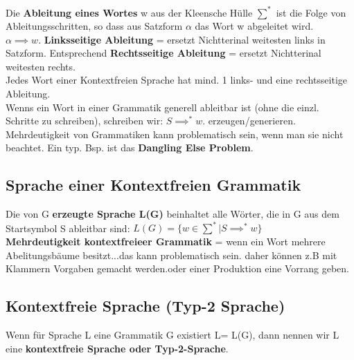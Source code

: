 Die \textbf{Ableitung eines Wortes} w aus der Kleensche Hülle $\sum^*$ ist die Folge von Ableitungsschritten, so dass aus Satzform $\alpha$ das Wort w abgeleitet wird.\\
$\alpha \implies w$. \textbf{Linksseitige Ableitung} = ersetzt Nichtterinal weitesten links in Satzform. Entsprechend \textbf{Rechtsseitige Ableitung} = ersetzt Nichtterinal weitesten rechts.\\
Jedes Wort einer Kontextfreien Sprache hat mind. 1 links- und eine rechtsseitige Ableitung.\\
Wenns ein Wort in einer Grammatik generell ableitbar ist (ohne die einzl. Schritte zu schreiben), schreiben wir: $S \implies ^* w$. erzeugen/generieren.\\ 

Mehrdeutigkeit von Grammatiken kann problematisch sein, wenn man sie nicht beachtet. Ein typ. Bsp. ist das \textbf{Dangling Else Problem}.\\

\subsection*{Sprache einer Kontextfreien Grammatik}
Die von G \textbf{erzeugte Sprache L(G)} beinhaltet alle Wörter, die in G aus dem Startsymbol S ableitbar sind: $L(G) = \{w \in \sum^* | S \implies ^* w \}$ \\
\textbf{Mehrdeutigkeit kontextfreieer Grammatik} = wenn ein Wort mehrere Abelitungsbäume besitzt...das kann problematisch sein. daher können z.B mit Klammern Vorgaben gemacht werden.oder einer Produktion eine Vorrang geben.

\subsection*{Kontextfreie Sprache (Typ-2 Sprache)}
Wenn für Sprache L eine Grammatik G existiert L= L(G), dann nennen wir L eine \textbf{kontextfreie Sprache oder Typ-2-Sprache}.



\pagebreak





